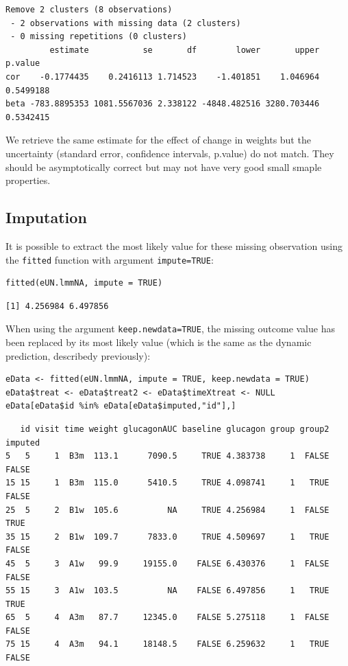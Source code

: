 \documentclass[12pt]{article}
\begin{document}
\begin{verbatim}
Remove 2 clusters (8 observations) 
 - 2 observations with missing data (2 clusters) 
 - 0 missing repetitions (0 clusters)
         estimate           se       df        lower       upper   p.value
cor    -0.1774435    0.2416113 1.714523    -1.401851    1.046964 0.5499188
beta -783.8895353 1081.5567036 2.338122 -4848.482516 3280.703446 0.5342415
\end{verbatim}



We retrieve the same estimate for the effect of change in weights but
the uncertainty (standard error, confidence intervals, p.value) do not
match. They should be asymptotically correct but may not have very
good small smaple properties.

\subsection{Imputation}
\label{imputation}
It is possible to extract the most likely value for these missing
observation using the \texttt{fitted} function with argument \texttt{impute=TRUE}:
\lstset{language=r,label= ,caption= ,captionpos=b,numbers=none}
\begin{lstlisting}
fitted(eUN.lmmNA, impute = TRUE)
\end{lstlisting}

\begin{verbatim}
[1] 4.256984 6.497856
\end{verbatim}


When using the argument \texttt{keep.newdata=TRUE}, the missing outcome value
has been replaced by its most likely value (which is the same as the
dynamic prediction, describedy previously):
\lstset{language=r,label= ,caption= ,captionpos=b,numbers=none}
\begin{lstlisting}
eData <- fitted(eUN.lmmNA, impute = TRUE, keep.newdata = TRUE)
eData$treat <- eData$treat2 <- eData$timeXtreat <- NULL
eData[eData$id %in% eData[eData$imputed,"id"],]
\end{lstlisting}

\begin{verbatim}
   id visit time weight glucagonAUC baseline glucagon group group2 imputed
5   5     1  B3m  113.1      7090.5     TRUE 4.383738     1  FALSE   FALSE
15 15     1  B3m  115.0      5410.5     TRUE 4.098741     1   TRUE   FALSE
25  5     2  B1w  105.6          NA     TRUE 4.256984     1  FALSE    TRUE
35 15     2  B1w  109.7      7833.0     TRUE 4.509697     1   TRUE   FALSE
45  5     3  A1w   99.9     19155.0    FALSE 6.430376     1  FALSE   FALSE
55 15     3  A1w  103.5          NA    FALSE 6.497856     1   TRUE    TRUE
65  5     4  A3m   87.7     12345.0    FALSE 5.275118     1  FALSE   FALSE
75 15     4  A3m   94.1     18148.5    FALSE 6.259632     1   TRUE   FALSE
\end{verbatim}
\end{document}
